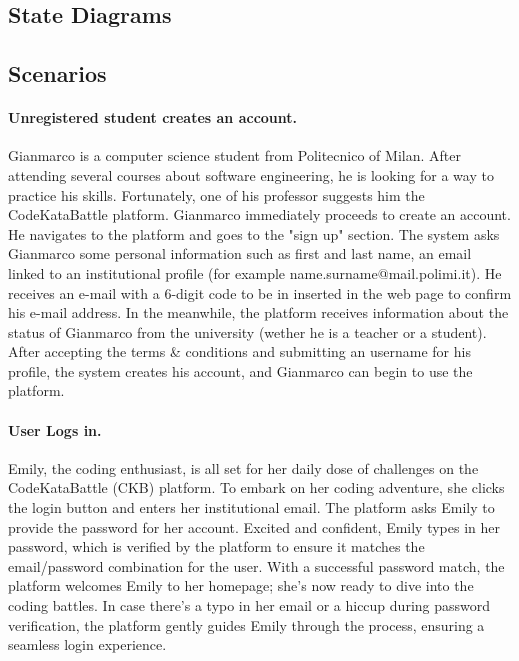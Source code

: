 \subsection{State Diagrams}
\label{subsec:state_diagrams}%


\subsection{Scenarios}
\label{subsec:scenarios}%

\paragraph{Unregistered student creates an account.}
Gianmarco is a computer science student from Politecnico of Milan. After attending several courses about software engineering, 
he is looking for a way to practice his skills. Fortunately, one of his professor suggests him the CodeKataBattle platform.
Gianmarco immediately proceeds to create an account. He navigates to the platform and goes to the "sign up" section. 
The system asks Gianmarco some personal information such as first and last name, an email linked 
to an institutional profile (for example name.surname@mail.polimi.it). He receives an e-mail with a 
6-digit code to be in inserted in the web page to confirm his e-mail address. In the meanwhile, the platform 
receives information about the status of Gianmarco from the university (wether he is a teacher or a student). 
After accepting the terms \& conditions 
and submitting an username for his profile, the system creates his account, and Gianmarco can begin to use the platform.

\paragraph*{User Logs in.}
Emily, the coding enthusiast, is all set for her daily dose of challenges on the CodeKataBattle (CKB) platform. 
To embark on her coding adventure, she clicks the login button and enters her institutional email.
The platform asks Emily to provide the password for her account. 
Excited and confident, Emily types in her password, which is verified by the platform to ensure it matches the email/password combination for the user.
With a successful password match, the platform welcomes Emily to her homepage; she's now ready to dive into the coding battles.
In case there's a typo in her email or a hiccup during password verification, the platform gently guides Emily through the process, ensuring a seamless login experience.

